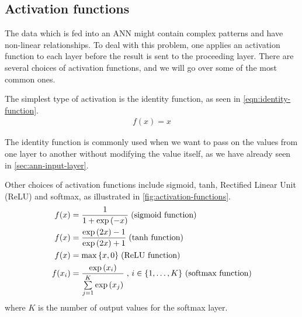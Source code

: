 \subsection{Activation functions}
\label{sec:activation-functions-ann}
The data which is fed into an ANN might contain complex patterns and have non-linear relationships. To deal with this problem, one applies an activation function to each layer before the result is sent to the proceeding layer. There are several choices of activation functions, and we will go over some of the most common ones.

The simplest type of activation is the identity function, as seen in \cref{eqn:identity-function}.
\begin{align}
    \label{eqn:identity-function}
    f(x) = x
\end{align}

The identity function is commonly used when we want to pass on the values from one layer to another without modifying the value itself, as we have already seen in \cref{sec:ann-input-layer}.

Other choices of activation functions include  sigmoid, tanh, Rectified Linear Unit (ReLU) and softmax, as illustrated in \cref{fig:activation-functions}.
\begin{align}
    \label{eqn:sigmoid-function}
    f(x) &= \frac{1}{1 + \exp{ \left( -x \right) }} \thickspace \text{(sigmoid function)} \\
    \label{eqn:tanh-function}
    f(x) &= \frac{\exp{ \left( 2x \right) } - 1}{\exp{ \left( 2x \right) } + 1} \thickspace \text{(tanh function)} \\
    \label{eqn:relu-function}
    f(x) &= \max{\left\{ x, 0 \right\}} \thickspace \text{(ReLU function)} \\
    \label{eqn:softmax-function}
    f(x_i) &= \frac{\exp \left( x_i \right)}{\sum\limits_{j=1}^{K} \exp \left( x_j \right)} \thickspace \text{, $i \in \left\{ 1, \ldots, K \right\}$ (softmax function)}
\end{align}
where $K$ is the number of output values for the softmax layer.

